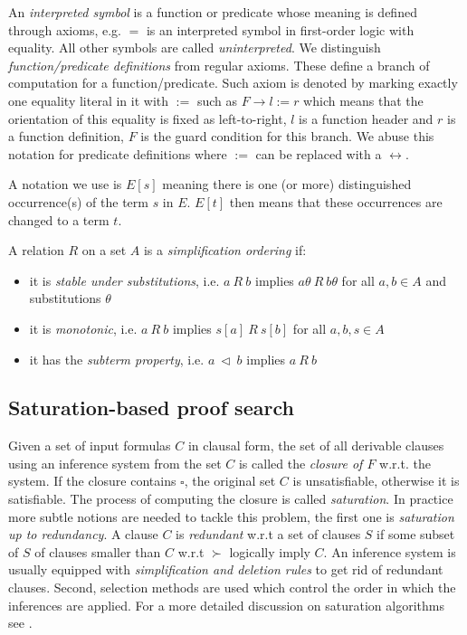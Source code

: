 An \textit{interpreted symbol} is a function or predicate whose meaning is defined through axioms, e.g. $=$ is an interpreted symbol in first-order logic with equality. All other symbols are called \textit{uninterpreted}. We distinguish \textit{function/predicate definitions} from regular axioms. These define a branch of computation for a function/predicate. Such axiom is denoted by marking exactly one equality literal in it with $:=$ such as $F\rightarrow l:=r$ which means that the orientation of this equality is fixed as left-to-right, $l$ is a function header and $r$ is a function definition, $F$ is the guard condition for this branch. We abuse this notation for predicate definitions where $:=$ can be replaced with a $\leftrightarrow$.

A notation we use is $E[s]$ meaning there is one (or more) distinguished occurrence(s) of the term $s$ in $E$. $E[t]$ then means that these occurrences are changed to a term $t$. 

A relation $R$ on a set $A$ is a \textit{simplification ordering} if:
\begin{itemize}
	\item it is \textit{stable under substitutions}, i.e. $a\ R\ b$ implies $a\theta\ R\ b\theta$ for all $a, b\in A$ and substitutions $\theta$
	\item it is \textit{monotonic}, i.e. $a\ R\ b$ implies $s[a]\ R\ s[b]$ for all $a,b,s\in A$
	\item it has the \textit{subterm property}, i.e. $a\ \triangleleft\ b$ implies $a\ R\ b$
\end{itemize}
\subsection{Saturation-based proof search}
Given a set of input formulas $C$ in clausal form, the set of all derivable clauses using an inference system from the set $C$ is called the \textit{closure of $F$} w.r.t. the system. If the closure contains $\square$, the original set $C$ is unsatisfiable, otherwise it is satisfiable. The process of computing the closure is called \textit{saturation}. In practice more subtle notions are needed to tackle this problem, the first one is \textit{saturation up to redundancy}. A clause $C$ is \textit{redundant} w.r.t a set of clauses $S$ if some subset of $S$ of clauses smaller than $C$ w.r.t $\succ$ logically imply $C$. An inference system is usually equipped with \textit{simplification and deletion rules} to get rid of redundant clauses. Second, selection methods are used which control the order in which the inferences are applied. For a more detailed discussion on saturation algorithms see \cite{cav13}.

